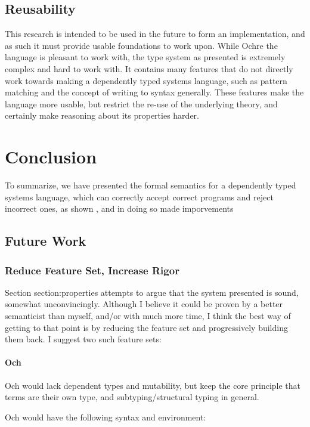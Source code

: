 \documentclass[12pt,twoside]{report}
\begin{document}
\section{Reusability}
This research is intended to be used in the future to form an implementation, and as such it must provide usable foundations to work upon. While Ochre the language is pleasant to work with, the type system as presented is extremely complex and hard to work with. It contains many features that do not directly work towards making a dependently typed systems language, such as pattern matching and the concept of writing to syntax generally. These features make the language more usable, but restrict the re-use of the underlying theory, and certainly make reasoning about its properties harder.

\chapter{Conclusion}
\label{chapter:conclusion}
To summarize, we have presented the formal semantics for a dependently typed systems language, which can correctly accept correct programs and reject incorrect ones, as shown , and in doing so made imporvements 

\section{Future Work}
\subsection{Reduce Feature Set, Increase Rigor}
Section {section:properties} attempts to argue that the system presented is sound, somewhat unconvincingly. Although I believe it could be proven by a better semanticist than myself, and/or with much more time, I think the best way of getting to that point is by reducing the feature set and progressively building them back. I suggest two such feature sets:

\subsubsection{Och}
Och would lack dependent types and mutability, but keep the core principle that terms are their own type, and subtyping/structural typing in general.

Och would have the following syntax and environment:
\end{document}
